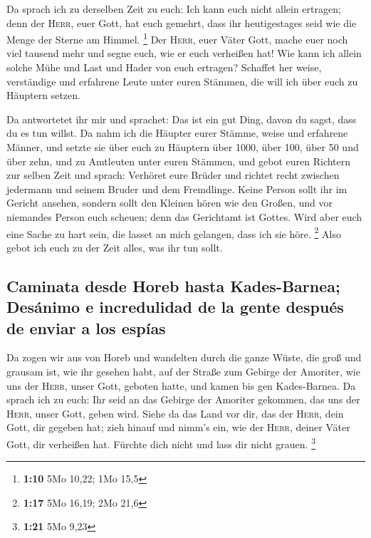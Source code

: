  Da sprach ich zu derselben Zeit zu euch: Ich kann euch
nicht allein ertragen;  denn der \textsc{Herr}, euer
Gott, hat euch gemehrt, dass ihr heutigestages seid wie die Menge der
Sterne am Himmel. \footnote{\textbf{1:10} 5Mo 10,22; 1Mo 15,5}
 Der \textsc{Herr}, euer Väter Gott, mache euer noch viel
tausend mehr und segne euch, wie er euch verheißen hat! 
Wie kann ich allein solche Mühe und Last und Hader von euch ertragen?
 Schaffet her weise, verständige und erfahrene Leute
unter euren Stämmen, die will ich über euch zu Häuptern setzen.

 Da antwortetet ihr mir und sprachet: Das ist ein gut
Ding, davon du sagst, dass du es tun willst.  Da nahm ich
die Häupter eurer Stämme, weise und erfahrene Männer, und setzte sie
über euch zu Häuptern über 1000, über 100, über 50 und über zehn, und zu
Amtleuten unter euren Stämmen,  und gebot euren Richtern
zur selben Zeit und sprach: Verhöret eure Brüder und richtet recht
zwischen jedermann und seinem Bruder und dem Fremdlinge. 
Keine Person sollt ihr im Gericht ansehen, sondern sollt den Kleinen
hören wie den Großen, und vor niemandes Person euch scheuen; denn das
Gerichtamt ist Gottes. Wird aber euch eine Sache zu hart sein, die
lasset an mich gelangen, dass ich sie höre. \footnote{\textbf{1:17} 5Mo
  16,19; 2Mo 21,6}  Also gebot ich euch zu der Zeit
alles, was ihr tun sollt.

\hypertarget{caminata-desde-horeb-hasta-kades-barnea-desuxe1nimo-e-incredulidad-de-la-gente-despuuxe9s-de-enviar-a-los-espuxedas}{%
\subsection{Caminata desde Horeb hasta Kades-Barnea; Desánimo e
incredulidad de la gente después de enviar a los
espías}\label{caminata-desde-horeb-hasta-kades-barnea-desuxe1nimo-e-incredulidad-de-la-gente-despuuxe9s-de-enviar-a-los-espuxedas}}

 Da zogen wir aus von Horeb und wandelten durch die ganze
Wüste, die groß und grausam ist, wie ihr gesehen habt, auf der Straße
zum Gebirge der Amoriter, wie uns der \textsc{Herr}, unser Gott, geboten
hatte, und kamen bis gen Kades-Barnea.  Da sprach ich zu
euch: Ihr seid an das Gebirge der Amoriter gekommen, das uns der
\textsc{Herr}, unser Gott, geben wird.  Siehe da das Land
vor dir, das der \textsc{Herr}, dein Gott, dir gegeben hat; zieh hinauf
und nimm's ein, wie der \textsc{Herr}, deiner Väter Gott, dir verheißen
hat. Fürchte dich nicht und lass dir nicht grauen. \footnote{\textbf{1:21}
  5Mo 9,23}

